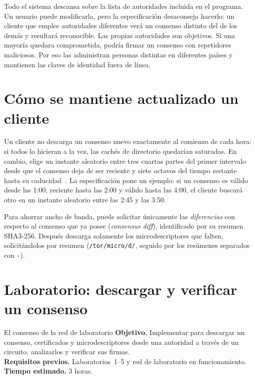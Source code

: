 \begin{attenzione}
Todo el sistema descansa sobre la lista de autoridades incluida en el programa. Un usuario puede modificarla, pero la especificación desaconseja hacerlo: un cliente que emplee autoridades diferentes verá un consenso distinto del de los demás y resultará reconocible. Las propias autoridades son objetivos. Si una mayoría quedara comprometida, podría firmar un consenso con repetidores maliciosos. Por eso las administran personas distintas en diferentes países y mantienen las claves de identidad fuera de línea.
\end{attenzione}

\section{Cómo se mantiene actualizado un cliente}\label{sec:dir-client}

Un cliente no descarga un consenso nuevo exactamente al comienzo de cada hora: si todos lo hicieran a la vez, las cachés de directorio quedarían saturadas. En cambio, elige un instante aleatorio entre tres cuartas partes del primer intervalo desde que el consenso deja de ser reciente y siete octavos del tiempo restante hasta su caducidad~. La especificación pone un ejemplo: si un consenso es válido desde las 1:00, reciente hasta las 2:00 y válido hasta las 4:00, el cliente buscará otro en un instante aleatorio entre las 2:45 y las 3:50.

Para ahorrar ancho de banda, puede solicitar únicamente las \emph{diferencias} con respecto al consenso que ya posee (\emph{consensus diff}), identificado por su resumen SHA3-256. Después descarga solamente los microdescriptores que falten, solicitándolos por resumen (\nolinkurl{/tor/micro/d/}, seguido por los resúmenes separados con \texttt{-}).

\section{Laboratorio: descargar y verificar un consenso}\label{sec:lab-directory}

\begin{laboratorio}[6]{El consenso de la red de laboratorio}
\textbf{Objetivo.} Implementar  para descargar un consenso, certificados y microdescriptores desde una autoridad a través de un circuito, analizarlos y verificar sus firmas.\\
\textbf{Requisitos previos.} Laboratorios~1--5 y red de laboratorio en funcionamiento.\\
\textbf{Tiempo estimado.} 3 horas.
\end{laboratorio}

